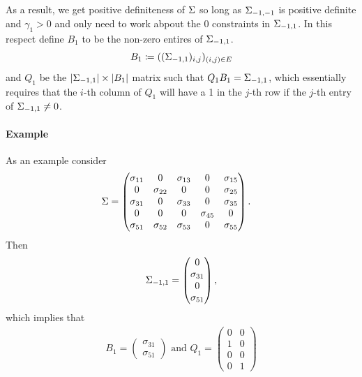 \documentclass[12pt, leqno]{article}
\providecommand{\abs}[1]{\lvert#1\rvert}
\def\s{\ensuremath\Sigma}
\begin{document}
As a result, we get positive definiteness of $\s$ so long as
$\s_{-1,-1}$ is positive definite and $\gamma_1>0$ and only need to
work abpout the $0$ constraints in $\s_{-1,1}$. In this respect define
$B_1$ to be the non-zero entires of $\s_{-1,1}$.
\[
B_1 \coloneqq ((\s_{-1,1})_{i,j})_{(i,j) \in E}
\]
and $Q_1$ be the $\abs{\s_{-1,1}} \times \abs{B_1}$ matrix such that
$Q_1B_1 = \s_{-1,1}$, which essentially requires that the $i$-th
column of $Q_1$ will have a 1 in the $j$-th row if the $j$-th entry of
$\s_{-1,1} \not= 0$.
\paragraph{Example} As an example consider
\begin{align*}
\s &=  \begin{pmatrix}
\sigma_{11}&0&\sigma_{13}&0&\sigma_{15}\\ 
0&\sigma_{22}&0&0&\sigma_{25}\\ 
\sigma_{31}&0 &\sigma_{33}&0&\sigma_{35}\\ 
0&0&0&\sigma_{45}&0\\ 
\sigma_{51}&\sigma_{52} &\sigma_{53}&0&\sigma_{55}
\end{pmatrix}.
\end{align*}
Then 
\begin{align*}
\s_{-1,1} =  \begin{pmatrix}
0\\ 
\sigma_{31}\\ 
0\\ 
\sigma_{51}
\end{pmatrix},
\end{align*}
which implies that 
\begin{align*}
B_1 =  \begin{pmatrix}
\sigma_{31}\\ 
\sigma_{51}
\end{pmatrix} 
\text{ and }
Q_1 =  \begin{pmatrix}
0&0\\ 
1&0\\ 
0&0\\ 
0&1
\end{pmatrix}
\end{align*}
\end{document}
